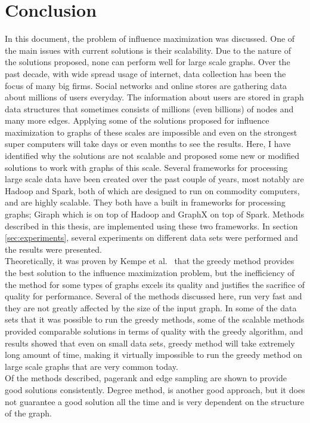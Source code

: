 \documentclass[english]{tktltiki}
\begin{document}
\section{Conclusion}
\label{sec:conclusion}
In this document, the problem of influence maximization was discussed. One of the main issues with current solutions is their scalability. Due to the nature of the solutions proposed, none can perform well for large scale graphs. Over the past decade, with wide spread usage of internet, data collection has been the focus of many big firms. Social networks and online stores are gathering data about millions of users everyday. The information about users are stored in graph data structures that sometimes consists of millions (even billions) of nodes and  many more edges. Applying some of the solutions proposed for influence maximization to graphs of these scales are impossible and even on the strongest super computers will take days or even months to see the results. Here, I have identified why the solutions are not scalable and proposed some new or modified solutions to work with graphs of this scale. Several frameworks for processing large scale data have been created over the past couple of years, most notably are Hadoop and Spark, both of which are designed to run on commodity computers, and are highly scalable. They both have a built in frameworks for processing graphs; Giraph which is on top of Hadoop and GraphX on top of Spark. Methods described in this thesis, are implemented using these two frameworks. In section \ref{sec:experiments}, several experiments on different data sets were performed and the results were presented. \\
Theoretically, it was proven by Kempe et al.\ \cite{kempe03} that the greedy method provides the best solution to the influence maximization problem, but the inefficiency of the method for some types of graphs excels its quality and justifies the sacrifice of quality for performance. Several of the methods discussed here, run very fast and they are not greatly affected by the size of the input graph. In some of the data sets that it was possible to run the greedy methods, some of the scalable methods provided comparable solutions in terms of quality with the greedy algorithm, and results showed that even on small data sets, greedy method will take extremely long amount of time, making it virtually impossible to run the greedy method on large scale graphs that are very common today. \\
Of the methods described, pagerank and edge sampling are shown to provide good solutions consistently. Degree method, is another good approach, but it does not guarantee a good solution all the time and is very dependent on the structure of the graph.\\ 
\end{document}
